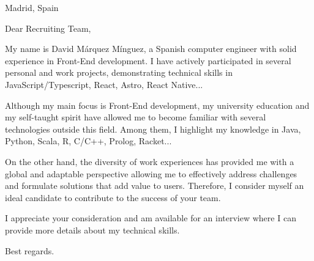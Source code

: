 \documentclass[letterpaper,11pt]{letter}
\begin{document}
\begin{letter}{Madrid, Spain}
\address{C/De la ilustración 3, 28902 Getafe}

\opening{Dear Recruiting Team,}

My name is David Márquez Mínguez, a Spanish computer engineer with solid experience in Front-End development. I have actively participated in several personal and 
work projects, demonstrating technical skills in JavaScript/Typescript, React, Astro, React Native...

Although my main focus is Front-End development, my university education and my self-taught spirit have allowed me to become familiar with several technologies 
outside this field. Among them, I highlight my knowledge in Java, Python, Scala, R, C/C++, Prolog, Racket...

On the other hand, the diversity of work experiences has provided me with a global and adaptable perspective allowing me to effectively address challenges and
formulate solutions that add value to users. Therefore, I consider myself an ideal candidate to contribute to the success of your team.

I appreciate your consideration and am available for an interview where I can provide more details about my technical skills.

\signature{\vspace{-35pt}David Márquez Mínguez}
\closing{Best regards.}




\end{letter}
\end{document}
